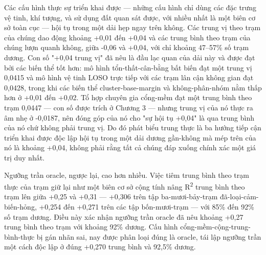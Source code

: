 Các cấu hình thực sự triển khai được --- những cấu hình chỉ dùng các đặc trưng vệ tinh, khí tượng, và sử dụng đất quan sát được, với nhiều nhất là một biên cơ sở toàn cục --- hội tụ trong một dải hẹp ngay trên không. Các trung vị theo trạm của chúng dao động khoảng +0,01 đến +0,04 và các trung bình theo trạm của chúng lượn quanh không, giữa -0,06 và +0,04, với chỉ khoảng 47--57\% số trạm dương. Con số "+0,04 trung vị" đã nêu là đầu lạc quan của dải này và được đạt bởi các biến thể tốt hơn: mô hình tổn-thất-cân-bằng bất biến đạt một trung vị 0,0415 và mô hình vệ tinh LOSO trực tiếp với các trạm lân cận không gian đạt 0,0428, trong khi các biến thể cluster-base-margin và không-phân-nhóm nằm thấp hơn ở +0,01 đến +0,02. Tổ hợp chuyên gia cổng-mềm đạt một trung bình theo trạm 0,0447 --- con số được trích ở Chương 3 --- nhưng trung vị của nó thực ra âm nhẹ ở -0,0187, nên đóng góp của nó cho "sự hội tụ +0,04" là qua trung bình của nó chứ không phải trung vị. Do đó phát biểu trung thực là ba hướng tiếp cận triển khai được độc lập hội tụ trong một dải dương gần-không mà mép trên của nó là khoảng +0,04, không phải rằng tất cả chúng đáp xuống chính xác một giá trị duy nhất.

Ngưỡng trần oracle, ngược lại, cao hơn nhiều. Việc tiêm trung bình theo trạm thực của trạm giữ lại như một biên cơ sở cộng tính nâng R\textsuperscript{2} trung bình theo trạm lên giữa +0,25 và +0,31 --- +0,306 trên tập ba-mươi-bảy-trạm đã-loại-cảm-biến-hỏng, +0,254 đến +0,271 trên các tập bốn-mươi-trạm --- với 85\% đến 92\% số trạm dương. Điều này xác nhận ngưỡng trần oracle đã nêu khoảng +0,27 trung bình theo trạm với khoảng 92\% dương. Cấu hình cổng-mềm-cộng-trung-bình-thực bị gán nhãn sai, nay được phân loại đúng là oracle, tái lập ngưỡng trần một cách độc lập ở đúng +0,270 trung bình và 92,5\% dương.

